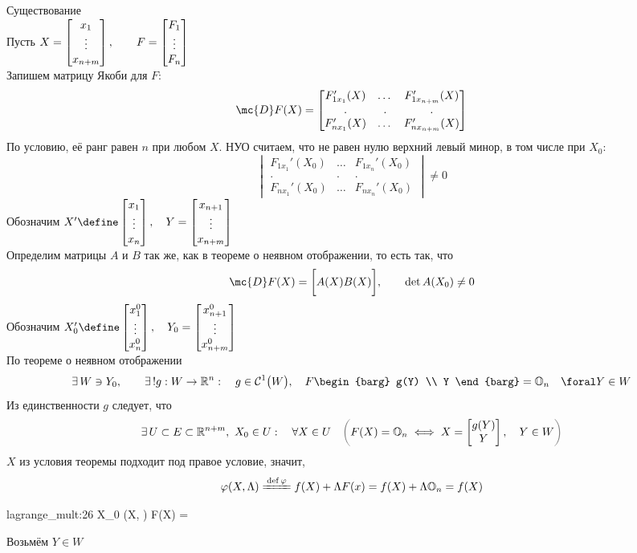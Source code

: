 \begin{iproof}
	\item Существование \\
	Пусть $ X =  \begin{bmatrix} {x_1} \\ \vdots \\ {x_{n + m}} \end{bmatrix} , \qquad F =  \begin{bmatrix} {F_1} \\ \vdots \\ {F_n} \end{bmatrix}  $ \\
	Запишем матрицу Якоби для $ F $:
	$$ \mc{D}F(X) =
	\begin{bmatrix}
		F_{1x_1}'(X) & \dots & F_{1x_{n + m}}'(X) \\
		. & . & . \\
		F_{nx_1}'(X) & \dots & F_{nx_{n + m}}'(X)
	\end{bmatrix} $$
	По условию, её ранг равен $ n $ при любом $ X $. НУО считаем, что не равен нулю верхний левый минор, в том числе при $ X_0 $:
	$$
	\begin{vmatrix}
		F_{1x_1}'(X_0) & \dots & F_{1x_n}'(X_0) \\
		. & . & . \\
		F_{nx_1}'(X_0) & \dots & F_{nx_n}'(X_0)
	\end{vmatrix} \ne 0 $$
	Обозначим $ X' \define \column{x_1}{x_n}, \quad Y = \column{x_{n + 1}}{x_{n + m}} $ \\
	Определим матрицы $ A $ и $ B $ так же, как в теореме о неявном отображении, то есть так, что
	$$ \mc{D}F(X) = \bigg[ A(X)B(X) \bigg], \qquad \det A(X_0) \ne 0 $$
	Обозначим $ X_0' \define \column{x_1^0}{x_n^0}, \quad Y_0 = \column{x_{n + 1}^0}{x_{n + m}^0} $ \\
	По теореме о неявном отображении
	$$ \exist W \ni Y_0, \qquad \exist! g : W \to \R^n : \quad g \in \Cont[1]W, \quad F
	\begin{barg}
		g(Y) \\
		Y
	\end{barg} = \On \quad \foral Y \in W $$
	Из единственности $ g $ следует, что
	$$ \exist U \sub E \sub \R^{n + m}, ~ X_0 \in U : \quad \forall X \in U \quad \nimp[\bigg(] F(X) = \On \iff X =
	\begin{bmatrix}
		g(Y) \\
		Y
	\end{bmatrix}, \quad Y \in W \nimp[\bigg)] $$
	$ X $ из условия теоремы подходит под правое условие, значит,
	$$ \vphi(X, \Lambda) \bdefeq\vphi f(X) + \Lambda F(x) = f(X) + \Lambda \On = f(X) $$
	\begin{equ}{lagrange_mult:26}
		 X_0  \vphi(X, \Lambda) \quad \forall \Lambda {} F(X) = \On
	\end{equ}
	Возьмём $ Y \in W $ \\

\end{iproof}

